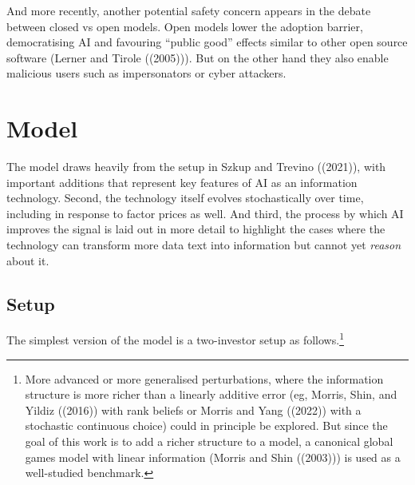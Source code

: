 \documentclass[
]{article}
\theoremstyle{plain}
\theoremstyle{definition}
\theoremstyle{remark}
\begin{document}
And more recently, another potential safety concern appears in the
debate between closed vs open models. Open models lower the adoption
barrier, democratising AI and favouring ``public good'' effects similar
to other open source software (Lerner and Tirole ((2005))). But on the
other hand they also enable malicious users such as impersonators or
cyber attackers.

\hypertarget{model}{%
\section{Model}\label{model}}

The model draws heavily from the setup in Szkup and Trevino ((2021)),
with important additions that represent key features of AI as an
information technology. Second, the technology itself evolves
stochastically over time, including in response to factor prices as
well. And third, the process by which AI improves the signal is laid out
in more detail to highlight the cases where the technology can transform
more data text into information but cannot yet \emph{reason} about it.

\hypertarget{setup}{%
\subsection{Setup}\label{setup}}

The simplest version of the model is a two-investor setup as
follows.\footnote{More advanced or more generalised perturbations, where
  the information structure is more richer than a linearly additive
  error (eg, Morris, Shin, and Yildiz ((2016)) with rank beliefs or
  Morris and Yang ((2022)) with a stochastic continuous choice) could in
  principle be explored. But since the goal of this work is to add a
  richer structure to a model, a canonical global games model with
  linear information (Morris and Shin ((2003))) is used as a
  well-studied benchmark.}
\end{document}
